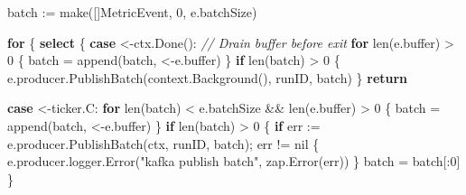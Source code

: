 \documentclass[
]{article}
\newenvironment{Shaded}{}{}
\newcommand{\BuiltInTok}[1]{\textcolor[rgb]{0.00,0.50,0.00}{#1}}
\newcommand{\CommentTok}[1]{\textcolor[rgb]{0.38,0.63,0.69}{\textit{#1}}}
\newcommand{\ControlFlowTok}[1]{\textcolor[rgb]{0.00,0.44,0.13}{\textbf{#1}}}
\newcommand{\DecValTok}[1]{\textcolor[rgb]{0.25,0.63,0.44}{#1}}
\newcommand{\NormalTok}[1]{#1}
\newcommand{\OperatorTok}[1]{\textcolor[rgb]{0.40,0.40,0.40}{#1}}
\newcommand{\OtherTok}[1]{\textcolor[rgb]{0.00,0.44,0.13}{#1}}
\newcommand{\StringTok}[1]{\textcolor[rgb]{0.25,0.44,0.63}{#1}}
\begin{document}
\begin{Shaded}
\begin{Highlighting}[]
\NormalTok{    batch }\OperatorTok{:=} \BuiltInTok{make}\OperatorTok{([]}\NormalTok{MetricEvent}\OperatorTok{,} \DecValTok{0}\OperatorTok{,}\NormalTok{ e}\OperatorTok{.}\NormalTok{batchSize}\OperatorTok{)}

    \ControlFlowTok{for} \OperatorTok{\{}
        \ControlFlowTok{select} \OperatorTok{\{}
        \ControlFlowTok{case} \OperatorTok{\textless{}{-}}\NormalTok{ctx}\OperatorTok{.}\NormalTok{Done}\OperatorTok{():}
            \CommentTok{// Drain buffer before exit}
            \ControlFlowTok{for} \BuiltInTok{len}\OperatorTok{(}\NormalTok{e}\OperatorTok{.}\NormalTok{buffer}\OperatorTok{)} \OperatorTok{\textgreater{}} \DecValTok{0} \OperatorTok{\{}
\NormalTok{                batch }\OperatorTok{=} \BuiltInTok{append}\OperatorTok{(}\NormalTok{batch}\OperatorTok{,} \OperatorTok{\textless{}{-}}\NormalTok{e}\OperatorTok{.}\NormalTok{buffer}\OperatorTok{)}
            \OperatorTok{\}}
            \ControlFlowTok{if} \BuiltInTok{len}\OperatorTok{(}\NormalTok{batch}\OperatorTok{)} \OperatorTok{\textgreater{}} \DecValTok{0} \OperatorTok{\{}
\NormalTok{                e}\OperatorTok{.}\NormalTok{producer}\OperatorTok{.}\NormalTok{PublishBatch}\OperatorTok{(}\NormalTok{context}\OperatorTok{.}\NormalTok{Background}\OperatorTok{(),}\NormalTok{ runID}\OperatorTok{,}\NormalTok{ batch}\OperatorTok{)}
            \OperatorTok{\}}
            \ControlFlowTok{return}

        \ControlFlowTok{case} \OperatorTok{\textless{}{-}}\NormalTok{ticker}\OperatorTok{.}\NormalTok{C}\OperatorTok{:}
            \ControlFlowTok{for} \BuiltInTok{len}\OperatorTok{(}\NormalTok{batch}\OperatorTok{)} \OperatorTok{\textless{}}\NormalTok{ e}\OperatorTok{.}\NormalTok{batchSize }\OperatorTok{\&\&} \BuiltInTok{len}\OperatorTok{(}\NormalTok{e}\OperatorTok{.}\NormalTok{buffer}\OperatorTok{)} \OperatorTok{\textgreater{}} \DecValTok{0} \OperatorTok{\{}
\NormalTok{                batch }\OperatorTok{=} \BuiltInTok{append}\OperatorTok{(}\NormalTok{batch}\OperatorTok{,} \OperatorTok{\textless{}{-}}\NormalTok{e}\OperatorTok{.}\NormalTok{buffer}\OperatorTok{)}
            \OperatorTok{\}}
            \ControlFlowTok{if} \BuiltInTok{len}\OperatorTok{(}\NormalTok{batch}\OperatorTok{)} \OperatorTok{\textgreater{}} \DecValTok{0} \OperatorTok{\{}
                \ControlFlowTok{if}\NormalTok{ err }\OperatorTok{:=}\NormalTok{ e}\OperatorTok{.}\NormalTok{producer}\OperatorTok{.}\NormalTok{PublishBatch}\OperatorTok{(}\NormalTok{ctx}\OperatorTok{,}\NormalTok{ runID}\OperatorTok{,}\NormalTok{ batch}\OperatorTok{);}\NormalTok{ err }\OperatorTok{!=} \OtherTok{nil} \OperatorTok{\{}
\NormalTok{                    e}\OperatorTok{.}\NormalTok{producer}\OperatorTok{.}\NormalTok{logger}\OperatorTok{.}\NormalTok{Error}\OperatorTok{(}\StringTok{"kafka publish batch"}\OperatorTok{,}\NormalTok{ zap}\OperatorTok{.}\NormalTok{Error}\OperatorTok{(}\NormalTok{err}\OperatorTok{))}
                \OperatorTok{\}}
\NormalTok{                batch }\OperatorTok{=}\NormalTok{ batch}\OperatorTok{[:}\DecValTok{0}\OperatorTok{]}
            \OperatorTok{\}}


\end{Highlighting}
\end{Shaded}
\end{document}
